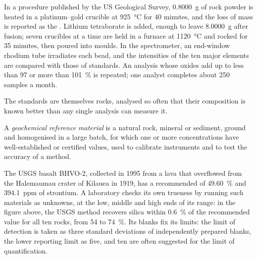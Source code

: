 \begin{inthelab}
In a procedure published by the US Geological Survey, \qty{0.8000}{g} of rock powder is heated in a
platinum--gold crucible at \qty{925}{\celsius} for 40 minutes, and the loss of mass is reported as
the . Lithium tetraborate is added, enough to leave \qty{8.0000}{g} after fusion;
seven crucibles at a time are held in a furnace at \qty{1120}{\celsius} and rocked for 35 minutes,
then poured into moulds. In the spectrometer, an end-window rhodium tube irradiates each bead, and
the intensities of the ten major elements are compared with those of standards. An analysis whose
oxides add up to less than 97 or more than \qty{101}{\percent} is repeated; one analyst completes
about 250 samples a month.
\end{inthelab}

The standards are themselves rocks, analysed so often that their composition is known better than
any single analysis can measure it.

\begin{definition}\label{def:b2:field-lab-methods-2:rm}
A \emph{geochemical reference material} is a natural rock,
mineral or sediment, ground and homogenised in a large batch, for which one or more concentrations
have well-established or certified values, used to calibrate instruments and to test the accuracy
of a method.
\end{definition}

The USGS basalt BHVO-2, collected in 1995 from a lava that overflowed from the Halemaumau crater of
Kilauea in 1919, has a recommended  of \qty{49.60}{\percent} and \qty{394.1}{ppm} of
strontium. A laboratory checks its own trueness by running such materials as unknowns, at the low,
middle and high ends of its range: in the figure above, the USGS method recovers silica within
\qty{0.6}{\percent} of the recommended value for all ten rocks, from  54 to
\qty{74}{\percent}. Its blanks fix its limits: the limit of detection is taken as three standard
deviations of independently prepared blanks, the lower reporting limit as five, and ten are often
suggested for the limit of quantification.

